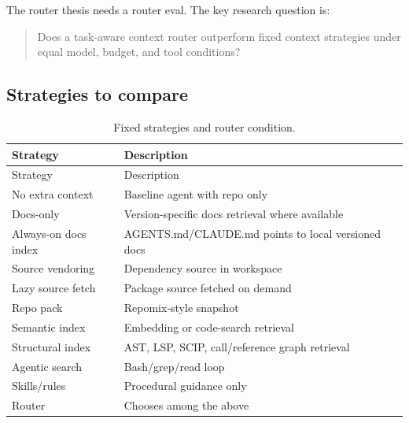 \documentclass[
  11pt,
  letterpaper,
  numbers=noendperiod,
  parskip=half]{scrartcl}
\begin{document}
The router thesis needs a router eval. The key research question is:

\begin{quote}
Does a task-aware context router outperform fixed context strategies
under equal model, budget, and tool conditions?
\end{quote}

\subsection{Strategies to compare}\label{sec-eval-strategies}

\begin{longtable}[]{@{}
  >{\raggedright\arraybackslash}p{}
  >{\raggedright\arraybackslash}p{}@{}}
\caption{Fixed strategies and router
condition.}\label{tbl-eval-strategies}\tabularnewline
\toprule\noalign{}
\begin{minipage}[b]{\linewidth}\raggedright
Strategy
\end{minipage} & \begin{minipage}[b]{\linewidth}\raggedright
Description
\end{minipage} \\
\midrule\noalign{}
\endfirsthead
\toprule\noalign{}
\begin{minipage}[b]{\linewidth}\raggedright
Strategy
\end{minipage} & \begin{minipage}[b]{\linewidth}\raggedright
Description
\end{minipage} \\
\midrule\noalign{}
\endhead
\bottomrule\noalign{}
\endlastfoot
No extra context & Baseline agent with repo only \\
Docs-only & Version-specific docs retrieval where available \\
Always-on docs index & AGENTS.md/CLAUDE.md points to local versioned
docs \\
Source vendoring & Dependency source in workspace \\
Lazy source fetch & Package source fetched on demand \\
Repo pack & Repomix-style snapshot \\
Semantic index & Embedding or code-search retrieval \\
Structural index & AST, LSP, SCIP, call/reference graph retrieval \\
Agentic search & Bash/grep/read loop \\
Skills/rules & Procedural guidance only \\
Router & Chooses among the above \\
\end{longtable}
\end{document}
